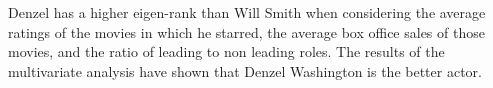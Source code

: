 \documentclass[]{article}
\begin{document}
Denzel has a higher eigen-rank than Will Smith when considering the
average ratings of the movies in which he starred, the average box
office sales of those movies, and the ratio of leading to non leading
roles. The results of the multivariate analysis have shown that Denzel
Washington is the better actor.






\newpage
\theendnotes

\newpage
\begin{auxmulticols}{1}
\singlespacing 
\end{auxmulticols}

\newpage
{
\hypersetup{linkcolor=black}
\setcounter{tocdepth}{3}
\tableofcontents
}
\end{document}
